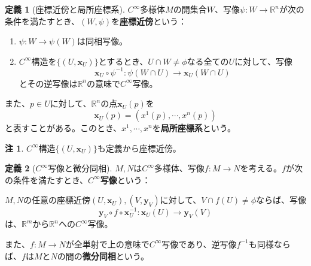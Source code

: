 \documentclass[unicode,a4paper,11pt]{ltjsarticle}
\theoremstyle{definition}
\newtheorem{dfn}{定義}[section]
\newtheorem{rmk}{注}[section]
\begin{document}
\begin{dfn}[座標近傍と局所座標系]
  $C^{\infty}$多様体$M$の開集合$W$、写像$\psi:W\rightarrow\mathbb{R}^{n}$が次の条件を満たすとき、$(W,\psi)$を\textbf{座標近傍}という：
  \begin{enumerate}
    \item
          $\psi:W\rightarrow\psi(W)$は同相写像。
    \item
          $C^{\infty}$構造を$\{(U,\bm{x}_{U})\}$とするとき、$U\cap W\neq\phi$なる全ての$U$に対して、写像
          \begin{equation}
            \bm{x}_{U}\circ\psi^{-1}
            :
            \psi(W\cap U)\rightarrow \bm{x}_{U}(W\cap U)
          \end{equation}
          とその逆写像は$\mathbb{R}^{n}$の意味で$C^{\infty}$写像。
  \end{enumerate}

  また、$p\in U$に対して、$\mathbb{R}^{n}$の点$\bm{x}_{U}(p)$を
  \begin{equation}
    \bm{x}_{U}(p)
    =
    (x^{1}(p),\cdots,x^{n}(p))
  \end{equation}
  と表すことがある。このとき、$x^{1},\cdots,x^{n}$を\textbf{局所座標系}という。
\end{dfn}

\begin{rmk}
  $C^{\infty}$構造$\{(U,\bm{x}_{U})\}$も定義から座標近傍。
\end{rmk}

\begin{dfn}[$C^{\infty}$写像と微分同相]
  $M,N$は$C^{\infty}$多様体、写像$f:M\rightarrow N$を考える。$f$が次の条件を満たすとき、\textbf{$C^{\infty}$写像}という：
  \begin{flushleft}
    $M,N$の任意の座標近傍$(U,\bm{x}_{U}),(V,\bm{y}_{V})$に対して、$V\cap f(U)\neq\phi$ならば、写像
    \begin{equation}
      \bm{y}_{V}\circ f\circ\bm{x}_{U}^{-1}
      :
      \bm{x}_{U}(U)\rightarrow\bm{y}_{V}(V)
    \end{equation}
    は、$\mathbb{R}^{m}$から$\mathbb{R}^{n}$への$C^{\infty}$写像。
  \end{flushleft}
  また、$f:M\rightarrow N$が全単射で上の意味で$C^{\infty}$写像であり、逆写像$f^{-1}$も同様ならば、$f$は$M$と$N$の間の\textbf{微分同相}という。
\end{dfn}
\end{document}
